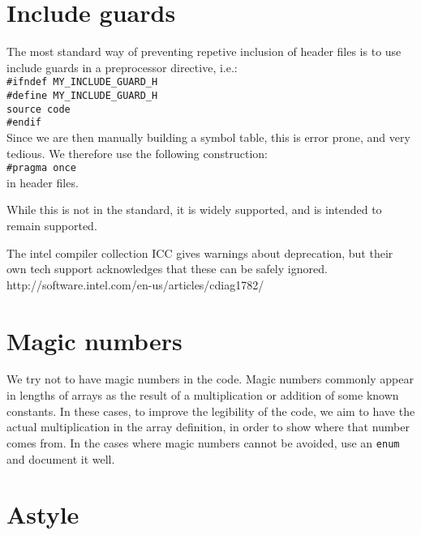 \documentclass[a4paper,10pt]{article}
\begin{document}
\section{Include guards}
The most standard way of preventing repetive inclusion of header files is to use include guards in a preprocessor directive, i.e.:\\
\verb|#ifndef MY_INCLUDE_GUARD_H|\\
\verb|#define MY_INCLUDE_GUARD_H|\\
\verb|source code|\\
\verb|#endif|\\
Since we are then manually building a symbol table, this is error prone, and very tedious. We therefore use the following construction:\\
\verb|#pragma once|\\
in header files.

While this is not in the standard, it is widely supported, and is intended to remain supported.

The intel compiler collection ICC gives warnings about deprecation, but their own tech support acknowledges that these can be safely ignored.\\
http://software.intel.com/en-us/articles/cdiag1782/
\section{Magic numbers}
We try not to have magic numbers in the code. Magic numbers commonly appear in lengths of arrays as the result of a multiplication or addition of some known constants. In these cases, to improve the legibility of the code, we aim to have the actual multiplication in the array definition, in order to show where that number comes from. In the cases where magic numbers cannot be avoided, use an \verb|enum| and document it well.
\section{Astyle}
\end{document}
